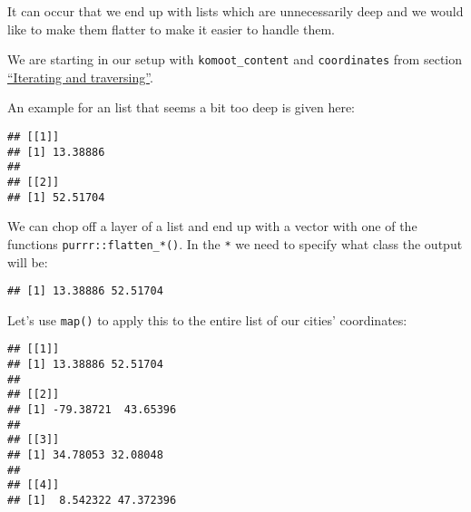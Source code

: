 \documentclass[]{book}
\newenvironment{Shaded}{\begin{snugshade}}{\end{snugshade}}
\newcommand{\DecValTok}[1]{\textcolor[rgb]{0.00,0.00,0.81}{#1}}
\newcommand{\KeywordTok}[1]{\textcolor[rgb]{0.13,0.29,0.53}{\textbf{#1}}}
\newcommand{\NormalTok}[1]{#1}
\newcommand{\OperatorTok}[1]{\textcolor[rgb]{0.81,0.36,0.00}{\textbf{#1}}}
\newcommand{\StringTok}[1]{\textcolor[rgb]{0.31,0.60,0.02}{#1}}
\begin{document}
It can occur that we end up with lists which are unnecessarily deep and we would like to make them flatter to make it easier to handle them.

We are starting in our setup with \texttt{komoot\_content} and \texttt{coordinates} from section \protect\hyperlink{komoot}{``Iterating and traversing''}.

An example for an list that seems a bit too deep is given here:

\begin{Shaded}
\end{Shaded}

\begin{verbatim}
## [[1]]
## [1] 13.38886
## 
## [[2]]
## [1] 52.51704
\end{verbatim}

We can chop off a layer of a list and end up with a vector with one of the functions \texttt{purrr::flatten\_*()}.
In the \texttt{*} we need to specify what class the output will be:

\begin{Shaded}
\end{Shaded}

\begin{verbatim}
## [1] 13.38886 52.51704
\end{verbatim}

Let's use \texttt{map()} to apply this to the entire list of our cities' coordinates:

\begin{Shaded}
\end{Shaded}

\begin{verbatim}
## [[1]]
## [1] 13.38886 52.51704
## 
## [[2]]
## [1] -79.38721  43.65396
## 
## [[3]]
## [1] 34.78053 32.08048
## 
## [[4]]
## [1]  8.542322 47.372396
\end{verbatim}
\end{document}
